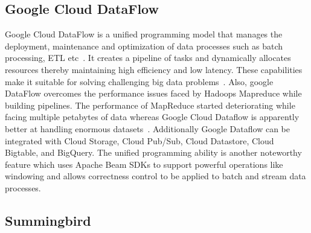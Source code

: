      \pv

\subsection{Google Cloud DataFlow}
     
Google Cloud DataFlow is a unified programming model that manages the
deployment, maintenance and optimization of data processes such as
batch processing, ETL etc~\cite{www-cloud-google1}. It creates a
pipeline of tasks and dynamically allocates resources thereby
maintaining high efficiency and low latency. These capabilities make
it suitable for solving challenging big data
problems~\cite{www-cloud-google1}. Also, google DataFlow overcomes the
performance issues faced by Hadoops Mapreduce while building
pipelines\cite{www-dataconomy}.  The performance of MapReduce started
deteriorating while facing multiple petabytes of data whereas Google
Cloud Dataflow is apparently better at handling enormous
datasets~\cite{www-cloud-google1}. Additionally Google Dataflow can be
integrated with Cloud Storage, Cloud Pub/Sub, Cloud Datastore, Cloud
Bigtable, and BigQuery. The unified programming ability is another
noteworthy feature which uses Apache Beam SDKs to support powerful
operations like windowing and allows correctness control to be applied
to batch and stream data processes.

     \pv

     
\subsection{Summingbird }
     
